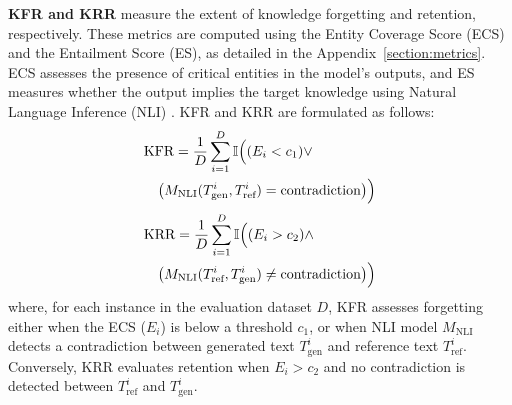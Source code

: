 \textbf{KFR and KRR} measure the extent of knowledge forgetting and retention, respectively. 
These metrics are computed using the Entity Coverage Score (ECS) and the Entailment Score (ES), as detailed in the Appendix~\ref{section:metrics}. 
ECS assesses the presence of critical entities in the model's outputs, and ES measures whether the output implies the target knowledge using Natural Language Inference (NLI) \citep{10.1145/3605943}. 
KFR and KRR are formulated as follows:
\vspace{-1.5ex}
\begin{align}
&\text{KFR} = \frac{1}{D} \sum_{i=1}^{D} \mathbb{I}\Big((E_i < c_1) \lor \notag \\
&\quad\big(M_{\text{NLI}}(T^i_{\text{gen}}, T^i_{\text{ref}}) = \text{contradiction}\big)\Big)
\label{eq:kfr}
\end{align}
\vspace{-4ex}
\begin{align}
&\text{KRR} = \frac{1}{D} \sum_{i=1}^{D} \mathbb{I}\Big((E_i > c_2) \land \notag \\ 
&\quad\big(M_{\text{NLI}}(T^i_{\text{ref}}, T^i_{\text{gen}}) \neq \text{contradiction}\big) \Big)
\label{eq:krr}
\end{align}
where, for each instance in the evaluation dataset \(D\), KFR assesses forgetting either when the ECS (\(E_i\)) is below a threshold \(c_1\), or when NLI model \(M_{\text{NLI}}\) detects a contradiction between generated text \(T^i_{\text{gen}}\) and reference text \(T^i_{\text{ref}}\). 
Conversely, KRR evaluates retention when \(E_i > c_2\) and no contradiction is detected between \(T^i_{\text{ref}}\) and \(T^i_{\text{gen}}\).

